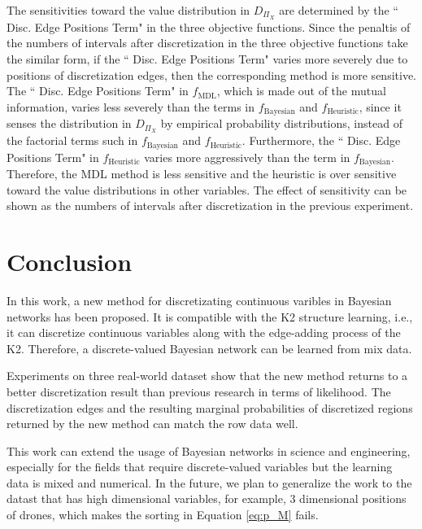 The sensitivities toward the value distribution in $D_{\Pi_X}$ are determined by the `` Disc. Edge Positions Term" in the three objective functions. Since the penaltis of the numbers of intervals after discretization in the three objective functions take the similar form, if the `` Disc. Edge Positions Term" varies more severely due to positions of discretization edges, then the corresponding method is more sensitive. The `` Disc. Edge Positions Term" in $f_{\text{MDL}}$, which is made out of the mutual information, varies less severely than the terms in $f_{\text{Bayesian}}$ and $f_{\text{Heuristic}}$, since it senses the distribution in $D_{\Pi_X}$ by empirical probability distributions, instead of the factorial terms such in $f_{\text{Bayesian}}$ and $f_{\text{Heuristic}}$. Furthermore, the `` Disc. Edge Positions Term" in $f_{\text{Heuristic}}$ varies more aggressively than the term in $f_{\text{Bayesian}}$. Therefore, the MDL method is less sensitive and the heuristic is over sensitive toward the value distributions in other variables. The effect of sensitivity can be shown as the numbers of intervals after discretization in the previous experiment.

\section{Conclusion}
In this work, a new method for discretizating continuous varibles in Bayesian networks has been proposed. It is compatible with the K2 structure learning, i.e., it can discretize continuous variables along with the edge-adding process of the K2. Therefore, a discrete-valued Bayesian network can be learned from mix data.

Experiments on three real-world dataset show that the new method returns to a better discretization result than previous research in terms of likelihood. The discretization edges and the resulting marginal probabilities of discretized regions returned by the new method can match the row data well.

This work can extend the usage of Bayesian networks in science and engineering, especially for the fields that require discrete-valued variables but the learning data is mixed and numerical. In the future, we plan to generalize the work to the datast that has high dimensional variables, for example, 3 dimensional positions of drones, which makes the sorting in Equation \ref{eq:p_M} fails.

